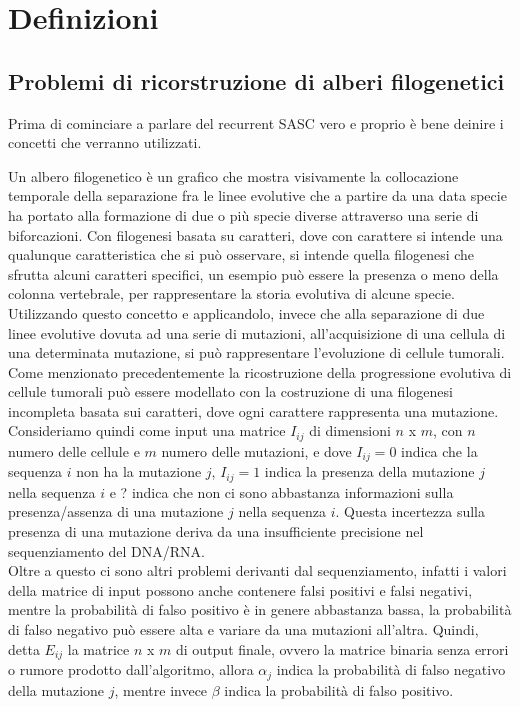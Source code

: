 \documentclass{report}
\begin{document}
\chapter{Definizioni}

\section{Problemi di ricorstruzione di alberi filogenetici}
  Prima di cominciare a parlare del recurrent SASC vero e proprio è bene deinire i concetti che verranno utilizzati.

  Un albero filogenetico è un grafico che mostra visivamente la collocazione temporale della separazione fra le linee evolutive che a partire da una data specie ha portato alla formazione di due o più specie diverse attraverso una serie di biforcazioni. Con filogenesi basata su caratteri, dove con carattere si intende una qualunque caratteristica che si può osservare, si intende quella filogenesi che sfrutta alcuni caratteri specifici, un esempio può essere la presenza o meno della colonna vertebrale, per rappresentare la storia evolutiva di alcune specie.
  Utilizzando questo concetto e applicandolo, invece che alla separazione di due linee evolutive dovuta ad una serie di mutazioni, all'acquisizione di una cellula di una determinata mutazione, si può rappresentare l'evoluzione di cellule tumorali.\\
  Come menzionato precedentemente la ricostruzione della progressione evolutiva di cellule tumorali può essere modellato con la costruzione di una filogenesi incompleta basata sui caratteri, dove ogni carattere rappresenta una mutazione.
  Consideriamo quindi come input una matrice  ${I}_{ij}$ di dimensioni $n$ x $m$, con $n$ numero delle cellule e $m$ numero delle mutazioni, e dove ${I}_{ij} = 0$ indica che la sequenza $i$ non ha la mutazione $j$, ${I}_{ij} = 1$ indica la presenza della mutazione $j$ nella sequenza $i$ e ? indica che non ci sono abbastanza informazioni sulla presenza/assenza di una mutazione $j$ nella sequenza $i$. Questa incertezza sulla presenza di una mutazione deriva da una insufficiente precisione nel sequenziamento del DNA/RNA.\\
  Oltre a questo ci sono altri problemi derivanti dal sequenziamento, infatti i valori della matrice di input possono anche contenere falsi positivi e falsi negativi, mentre la probabilità di falso positivo è in genere abbastanza bassa, la probabilità di falso negativo può essere alta e variare da una mutazioni all'altra.
  Quindi, detta $E_{ij}$ la matrice $n$ x $m$ di output finale, ovvero la matrice binaria senza errori o rumore prodotto dall'algoritmo, allora ${\alpha}_{j}$ indica la probabilità di falso negativo della mutazione $j$, mentre invece $\beta$ indica la probabilità di falso positivo.\\
\end{document}

